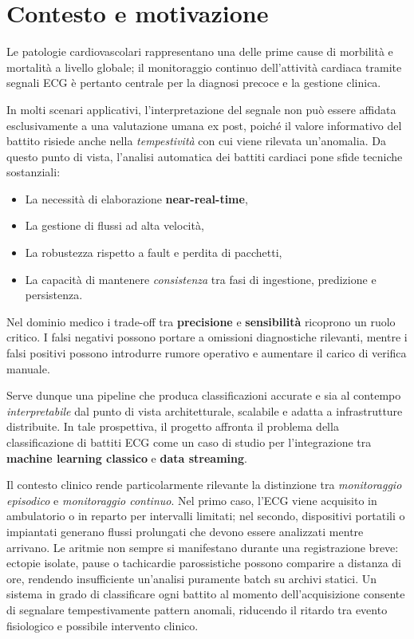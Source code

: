 \section{Contesto e motivazione}
Le patologie cardiovascolari rappresentano una delle prime cause di morbilità e mortalità a livello globale; il monitoraggio continuo dell'attività cardiaca tramite segnali ECG è pertanto centrale per la diagnosi precoce e la gestione clinica.

In molti scenari applicativi, l'interpretazione del segnale non può essere affidata esclusivamente a una valutazione umana ex post, poiché il valore informativo del battito risiede anche nella \emph{tempestività} con cui viene rilevata un'anomalia.
Da questo punto di vista, l'analisi automatica dei battiti cardiaci pone sfide tecniche sostanziali:
\begin{itemize}
  \item La necessità di elaborazione \textbf{near-real-time},
  \item La gestione di flussi ad alta velocità,
  \item La robustezza rispetto a fault e perdita di pacchetti,
  \item La capacità di mantenere \emph{consistenza} tra fasi di ingestione, predizione e persistenza.
\end{itemize}

Nel dominio medico i trade-off tra \textbf{precisione} e \textbf{sensibilità} ricoprono un ruolo critico.
I falsi negativi possono portare a omissioni diagnostiche rilevanti, mentre i falsi positivi possono introdurre rumore operativo e aumentare il carico di verifica manuale.

Serve dunque una pipeline che produca classificazioni accurate e sia al contempo \emph{interpretabile} dal punto di vista architetturale, scalabile e adatta a infrastrutture distribuite.
In tale prospettiva, il progetto affronta il problema della classificazione di battiti ECG come un caso di studio per l'integrazione tra \textbf{machine learning classico} e \textbf{data streaming}.

Il contesto clinico rende particolarmente rilevante la distinzione tra \emph{monitoraggio episodico} e \emph{monitoraggio continuo}.
Nel primo caso, l'ECG viene acquisito in ambulatorio o in reparto per intervalli limitati; nel secondo, dispositivi portatili o impiantati generano flussi prolungati che devono essere analizzati mentre arrivano.
Le aritmie non sempre si manifestano durante una registrazione breve: ectopie isolate, pause o tachicardie parossistiche possono comparire a distanza di ore, rendendo insufficiente un'analisi puramente batch su archivi statici.
Un sistema in grado di classificare ogni battito al momento dell'acquisizione consente di segnalare tempestivamente pattern anomali, riducendo il ritardo tra evento fisiologico e possibile intervento clinico.

